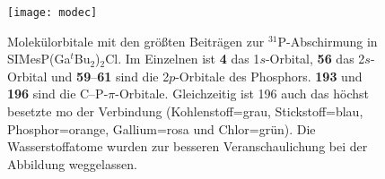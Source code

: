 \begin{figure}[ht!]
	\centering
	\texttt{[image: modec]}
	\captionsetup{figurewithin = chapter}
	\captionsetup{font=small, labelfont=bf}\caption[{Molekülorbitale von SIMesP(Ga$^\textit{t}$Bu$_2$)$_2$Cl}]{Molekülorbitale mit den größten Beiträgen zur $^{31}$P-Abschirmung in \mbox{SIMesP(Ga$^\textit{t}$Bu$_2$)$_2$Cl}. Im Einzelnen ist \textbf{\textsf{4}} das 1$s$-Orbital, \textbf{\textsf{56}} das 2$s$-Orbital und \textbf{\textsf{59}}--\textbf{\textsf{61}} sind die 2$p$-Orbitale des Phosphors. \textbf{\textsf{193}} und \textbf{\textsf{196}} sind die C--P-$\pi$-Orbitale. Gleichzeitig ist 196 auch das höchst besetzte \ac{mo} der Verbindung (Kohlenstoff=grau, Stickstoff=blau, Phosphor=orange, Gallium=rosa und Chlor=grün). Die Wasserstoffatome wurden zur besseren Veranschaulichung bei der Abbildung weggelassen.}
\label{abb:modec}
\end{figure}

